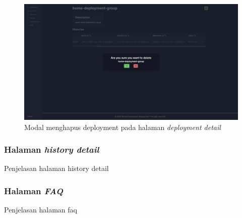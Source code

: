 \begin{figure}[h]
  \centering
  \includegraphics[width=1\textwidth]{resources/chapter-4/dashboard/deployment-detail-delete.jpg}
  \caption{Modal menghapus deployment pada halaman \textit{deployment detail}}
  \label{fig:halaman-deployment-detail-delete}
\end{figure}

\pagebreak

\subsubsection{Halaman \textit{history detail}}
Penjelasan halaman history detail

\subsubsection{Halaman \textit{FAQ}}
Penjelasan halaman faq

